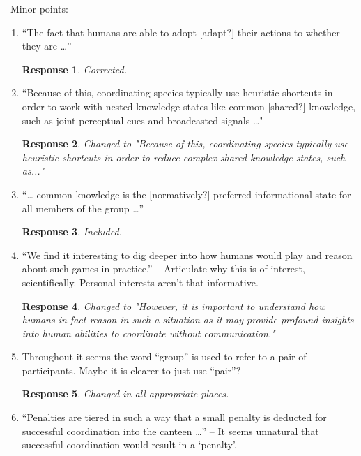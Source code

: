\documentclass[a4paper]{article}
\newtheorem{response}{Response}
\begin{document}




--Minor points:
\begin{enumerate}
   \item[1.]    “The fact that humans are able to adopt [adapt?] their actions to whether they are …” \begin{response} Corrected. \end{response}
   \item[2.]    “Because of this, coordinating species typically use heuristic shortcuts in order to work with nested knowledge states like common [shared?] knowledge, such as joint perceptual cues and broadcasted signals …" \begin{response}Changed to "Because of this, coordinating species typically use heuristic shortcuts in order to reduce complex shared knowledge states, such as..."\end{response} 
  \item[4.]    “… common knowledge is the [normatively?] preferred informational state for all members of the group …” \begin{response} Included. \end{response}
  \item[5.]    “We find it interesting to dig deeper into how humans would play and reason about such games in practice.” – Articulate why this is of interest, scientifically. Personal interests aren’t that informative. \begin{response}Changed to "However, it is important to understand how humans in fact reason in such a situation as it may provide profound insights into human abilities to coordinate without communication." \end{response}
  \item[6.]    Throughout it seems the word “group” is used to refer to a pair of participants. Maybe it is clearer to just use “pair”?  \begin{response} Changed in all appropriate places. \end{response}
  \item[7.]    “Penalties are tiered in such a way that a small penalty is deducted for successful coordination into the canteen …” – It seems unnatural that successful coordination would result in a ‘penalty’.  
  

\end{enumerate}
\end{document}

